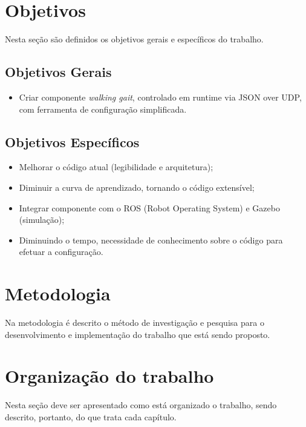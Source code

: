 \section{Objetivos}

Nesta seção são definidos os objetivos gerais e específicos do trabalho.

\subsection{Objetivos Gerais}

\begin{itemize}
	\item Criar componente \textit{walking gait}, controlado em runtime via JSON over UDP, com ferramenta de configuração simplificada.
\end{itemize}

\subsection{Objetivos Específicos} 

\begin{itemize}
	\item Melhorar o código atual (legibilidade e arquitetura);
	\item Diminuir a curva de aprendizado, tornando o código extensível;
	\item Integrar componente com o ROS (Robot Operating System) e Gazebo (simulação);
	\item Diminuindo o tempo, necessidade de conhecimento sobre o código para efetuar a configuração.
\end{itemize}

\section{Metodologia}

Na metodologia é descrito o método de investigação e pesquisa para o
desenvolvimento e implementação do trabalho que está sendo proposto.

\section{Organização do trabalho}

Nesta seção deve ser apresentado como está organizado o trabalho, sendo
descrito, portanto, do que trata cada capítulo.
